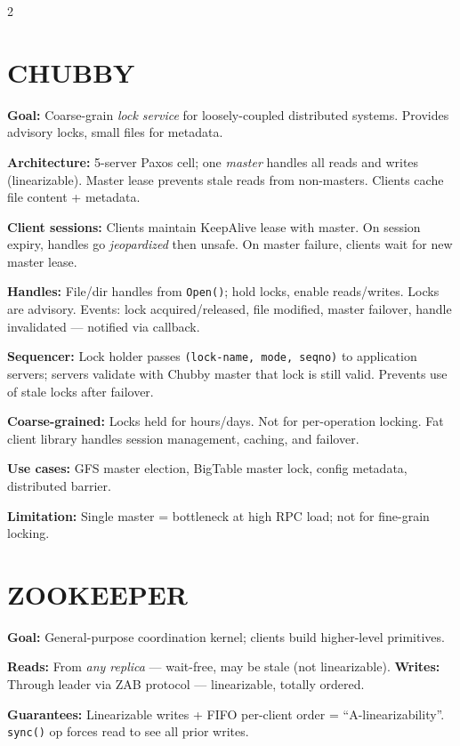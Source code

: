 \documentclass[9pt]{article}
\begin{document}
\begin{multicols*}{2}
\section*{CHUBBY}

\textbf{Goal:} Coarse-grain \emph{lock service} for loosely-coupled distributed systems. Provides advisory locks, small files for metadata.

\textbf{Architecture:} 5-server Paxos cell; one \emph{master} handles all reads and writes (linearizable). Master lease prevents stale reads from non-masters. Clients cache file content + metadata.

\textbf{Client sessions:} Clients maintain KeepAlive lease with master. On session expiry, handles go \emph{jeopardized} then unsafe. On master failure, clients wait for new master lease.

\textbf{Handles:} File/dir handles from \texttt{Open()}; hold locks, enable reads/writes. Locks are advisory. Events: lock acquired/released, file modified, master failover, handle invalidated — notified via callback.

\textbf{Sequencer:} Lock holder passes \texttt{(lock-name, mode, seqno)} to application servers; servers validate with Chubby master that lock is still valid. Prevents use of stale locks after failover.

\textbf{Coarse-grained:} Locks held for hours/days. Not for per-operation locking. Fat client library handles session management, caching, and failover.

\textbf{Use cases:} GFS master election, BigTable master lock, config metadata, distributed barrier.

\textbf{Limitation:} Single master = bottleneck at high RPC load; not for fine-grain locking.

\section*{ZOOKEEPER}

\textbf{Goal:} General-purpose coordination kernel; clients build higher-level primitives.

\textbf{Reads:} From \emph{any replica} — wait-free, may be stale (not linearizable). \textbf{Writes:} Through leader via ZAB protocol — linearizable, totally ordered.

\textbf{Guarantees:} Linearizable writes + FIFO per-client order = ``A-linearizability''. \texttt{sync()} op forces read to see all prior writes.


\end{multicols*}
\end{document}
